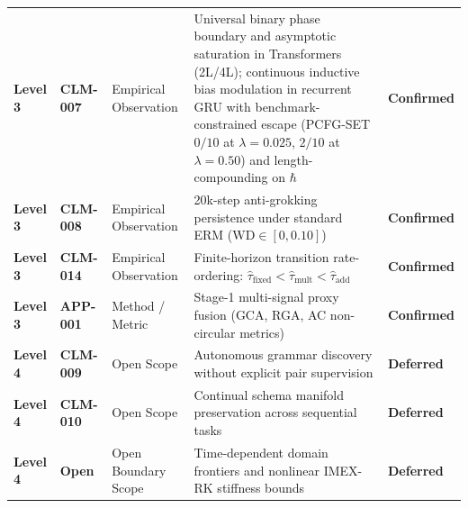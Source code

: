 \documentclass{article}
\theoremstyle{plain}
\theoremstyle{definition}
\begin{document}
\begin{table}[t]
\begin{small}
{\begin{tabular}{lllll}
\textbf{Level 3} & \textbf{CLM-007} & Empirical Observation & Universal binary phase boundary and asymptotic saturation in Transformers (2L/4L); continuous inductive bias modulation in recurrent GRU with benchmark-constrained escape (PCFG-SET $0/10$ at $\lambda=0.025$, $2/10$ at $\lambda=0.50$) and length-compounding on $\hbar$ & \textbf{Confirmed} \\
\textbf{Level 3} & \textbf{CLM-008} & Empirical Observation & 20k-step anti-grokking persistence under standard ERM ($\text{WD} \in [0, 0.10]$) & \textbf{Confirmed} \\
\textbf{Level 3} & \textbf{CLM-014} & Empirical Observation & Finite-horizon transition rate-ordering: $\hat{\tau}_{\text{fixed}} < \hat{\tau}_{\text{mult}} < \hat{\tau}_{\text{add}}$ & \textbf{Confirmed} \\
\textbf{Level 3} & \textbf{APP-001} & Method / Metric & Stage-1 multi-signal proxy fusion (GCA, RGA, AC non-circular metrics) & \textbf{Confirmed} \\
\textbf{Level 4} & \textbf{CLM-009} & Open Scope & Autonomous grammar discovery without explicit pair supervision & \textbf{Deferred} \\
\textbf{Level 4} & \textbf{CLM-010} & Open Scope & Continual schema manifold preservation across sequential tasks & \textbf{Deferred} \\
\textbf{Level 4} & \textbf{Open} & Open Boundary Scope & Time-dependent domain frontiers and nonlinear IMEX-RK stiffness bounds & \textbf{Deferred} \\
\bottomrule
\end{tabular}%
}
\end{small}
\end{table}
\end{document}
